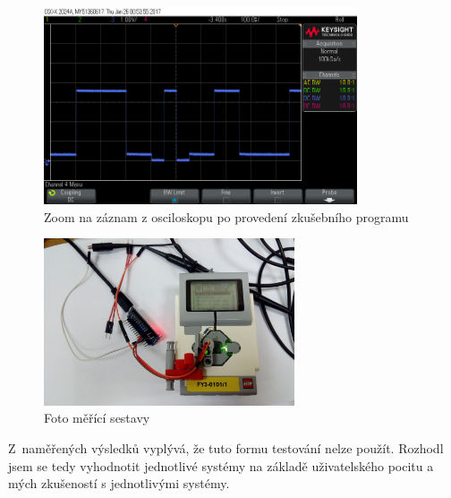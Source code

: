 \begin{figure}[h]
	\centering
	\includegraphics[width=350px]{images/measuring-oscilloscope_ev3-software_led-blinking_part1.png}
	\caption[Zoom na záznam z osciloskopu po provedení zkušebního programu]{Zoom na záznam z osciloskopu po provedení zkušebního programu}
	\label{fig:measuring_lego-ev3_orig-soft_led-blinking_part1}
\end{figure}

\begin{figure}[h]
	\centering
	\includegraphics[width=280px]{images/measuring-system_photo.jpg}
	\caption[Foto měřící sestavy]{Foto měřící sestavy}
	\label{fig:measuring-system_photo}
\end{figure}

Z~naměřených výsledků vyplývá, že tuto formu testování nelze použít.
Rozhodl jsem se tedy vyhodnotit jednotlivé systémy na základě uživatelského pocitu a mých zkušeností s jednotlivými systémy.

